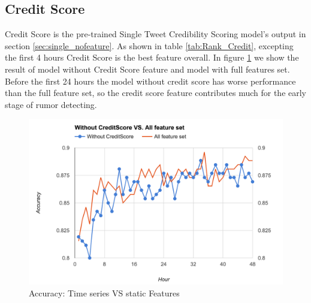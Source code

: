  \subsection{Credit Score} 
Credit Score is the pre-trained Single Tweet Credibility Scoring model's output in section \ref{sec:single_nofeature}. As shown in table \ref{tab:Rank_Credit}, excepting the first 4 hours Credit Score is the best feature overall. In figure \ref{fig:WCVSAF} we show the result of model without Credit Score feature and model with full features set. Before the first 24 hours the model without credit score has worse performance than the full feature set, so the credit score feature contributes much for the early stage of rumor detecting. 

 \begin{figure}[!h]
\centering
\includegraphics[width=\columnwidth]{images/WCVSAF.png}
\caption{Accuracy: Time series VS static Features}
\label{fig:WCVSAF}
\end{figure}

  \begin{table}[!h]
 \centering
{}
\caption{Ranks of CreditScore}
\label{tab:Rank_Credit}
\end{table}
  
